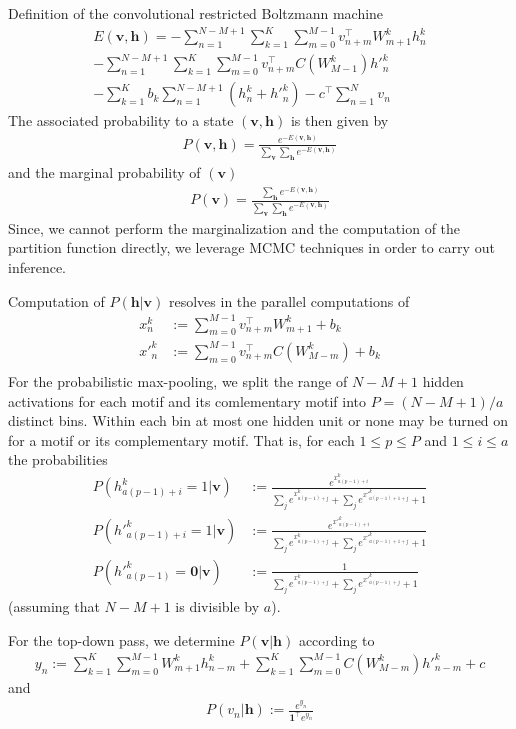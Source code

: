 \documentclass[12pt]{article}
\begin{document}
Definition of the convolutional restricted Boltzmann machine
\begin{align}
	E(\mathbf{v},\mathbf{h})=
	-\sum_{n=1}^{N-M+1}\sum_{k=1}^K\sum_{m=0}^{M-1} v_{n+m}^\top W_{m+1}^k h_n^k \nonumber\\
	-\sum_{n=1}^{N-M+1}\sum_{k=1}^K\sum_{m=0}^{M-1} v_{n+m}^\top C(W_{M-1}^k) {h'}_n^k\nonumber\\
	- \sum_{k=1}^K b_k \sum_{n=1}^{N-M+1}(h_n^k + {h'}_n^k)
	-c^\top \sum_{n=1}^{N}v_n
\end{align}
The associated probability to a state $(\mathbf{v},\mathbf{h})$ is then given
by
\begin{align}
	P(\mathbf{v},\mathbf{h})=\frac{e^{-E(\mathbf{v},\mathbf{h})}}
	{\sum_{\mathbf{v}}\sum_{\mathbf{h}}e^{-E(\mathbf{v},\mathbf{h})}}
\end{align}
and the marginal probability of $(\mathbf{v})$
\begin{align}
	P(\mathbf{v})=\frac{\sum_{\mathbf{h}}e^{-E(\mathbf{v},\mathbf{h})}}
	{\sum_{\mathbf{v}}\sum_{\mathbf{h}}e^{-E(\mathbf{v},\mathbf{h})}}
\end{align}
Since, we cannot perform the marginalization and the computation of the
partition function directly, we leverage MCMC techniques in order
to carry out inference.\par
Computation of $P(\mathbf{h}|\mathbf{v})$ resolves in the parallel computations
of 
\begin{align}
	x_n^k&:=\sum_{m=0}^{M-1}v_{n+m}^\top W_{m+1}^k + b_k\\
	{x'}_n^k&:=\sum_{m=0}^{M-1}v_{n+m}^\top C(W_{M-m}^k) + b_k\\
\end{align}
For the probabilistic max-pooling, we split the range of $N-M+1$ hidden activations for
each motif and its comlementary motif into $P=(N-M+1)/a$ distinct bins.
Within each bin at most one hidden unit or none 
may be turned on for a motif or its complementary motif.
That is, for each $1\leq p\leq P$ and $1\leq i\leq a$ the probabilities
\begin{align}
	P(h_{a(p-1)+i}^k=1|\mathbf{v})&:=\frac{e^{x_{a(p-1)+i}^k}}{\sum_j e^{x_{a(p-1)+j}^k}+ \sum_j e^{{x'}_{a(p-1)+1+j}^k}+1}\\
	P({h'}_{a(p-1)+i}^k=1|\mathbf{v})&:=\frac{e^{{x'}_{a(p-1)+i}^k}}{\sum_j e^{x_{a(p-1)+j}^k}+ \sum_j e^{{x'}_{a(p-1)+1+j}^k}+1}\\
	P({h'}_{a(p-1)}^k=\mathbf{0}|\mathbf{v})&:=\frac{1}{\sum_j e^{x_{a(p-1)+j}^k}+ \sum_j e^{{x'}_{a(p-1)+j}^k}+1}
\end{align}
(assuming that $N-M+1$ is divisible by $a$).\par
For the top-down pass, we determine $P(\mathbf{v}|\mathbf{h})$ according to
\begin{align}
	y_n:=\sum_{k=1}^K\sum_{m=0}^{M-1} W_{m+1}^k h_{n-m}^k + \sum_{k=1}^K\sum_{m=0}^{M-1} C(W_{M-m}^k) {h'}_{n-m}^k + c
\end{align}
and 
\begin{align}
	P(v_n|\mathbf{h}):=\frac{e^{y_n}}{\mathbf{1}^\top e^{y_n}}
\end{align}
\end{document}
